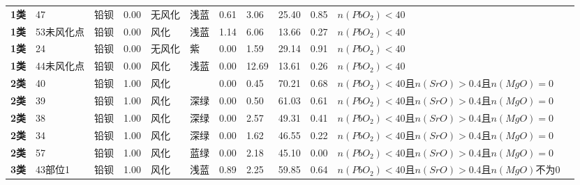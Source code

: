 \documentclass[withoutpreface,bwprint]{cumcmthesis} %
\begin{document}
\begin{appendices}
\begin{table}[!h]
\begin{tabular}{@{}llllllllllll@{}}
			\textbf{1类} & 47             & 铅钡          & 0.00      & 无风化           & 浅蓝          & 0.61              & 3.06                & 25.40             & 0.85              & $n(PbO_2)<40$                          &           \\
			\textbf{1类} & 53未风化点         & 铅钡          & 0.00      & 风化            & 浅蓝          & 1.14              & 6.06                & 13.66             & 0.27              & $n(PbO_2)<40$                          &           \\
			\textbf{1类} & 24             & 铅钡          & 0.00      & 无风化           & 紫           & 0.00              & 1.59                & 29.14             & 0.91              & $n(PbO_2)<40$                          &           \\
			\textbf{1类} & 44未风化点         & 铅钡          & 0.00      & 风化            & 浅蓝          & 0.00              & 12.69               & 13.61             & 0.26              & $n(PbO_2)<40$                          &           \\
			\textbf{2类} & 40             & 铅钡          & 1.00      & 风化            &             & 0.00              & 0.45                & 70.21             & 0.68              & $n(PbO_2)<40$且$n(SrO)>0.4$且$n(MgO)=0$  &           \\
			\textbf{2类} & 39             & 铅钡          & 1.00      & 风化            & 深绿          & 0.00              & 0.50                & 61.03             & 0.61              & $n(PbO_2)<40$且$n(SrO)>0.4$且$n(MgO)=0$  &           \\
			\textbf{2类} & 38             & 铅钡          & 1.00      & 风化            & 深绿          & 0.00              & 2.57                & 49.31             & 0.41              & $n(PbO_2)<40$且$n(SrO)>0.4$且$n(MgO)=0$  &           \\
			\textbf{2类} & 34             & 铅钡          & 1.00      & 风化            & 深绿          & 0.00              & 1.62                & 46.55             & 0.22              & $n(PbO_2)<40$且$n(SrO)>0.4$且$n(MgO)=0$  &           \\
			\textbf{2类} & 57             & 铅钡          & 1.00      & 风化            & 蓝绿          & 0.00              & 2.18                & 45.10             & 0.00              & $n(PbO_2)<40$且$n(SrO)>0.4$且$n(MgO)=0$  &           \\
			\textbf{3类} & 43部位1          & 铅钡          & 1.00      & 风化            & 浅蓝          & 0.89              & 2.25                & 59.85             & 0.64              & $n(PbO_2)<40$且$n(SrO)>0.4$且$n(MgO)不为0$ &           \\

\end{tabular}
\end{table}
\end{appendices}
\end{document}
